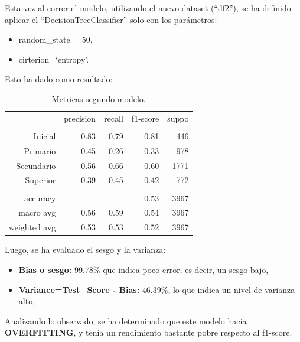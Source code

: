 \documentclass[a4paper]{article}
\begin{document}
            Esta vez al correr el modelo, utilizando el nuevo dataset (``df2''), se ha definido aplicar el ``DecisionTreeClassifier'' solo con los parámetros:
            \begin{itemize}
                \item random\_state = 50,
                \item cirterion=`entropy'.
            \end{itemize}

\vspace{1cm}
            Esto ha dado como resultado:  

            \begin{table}[!ht]
                \centering
                \begin{tabular}{rrrrr}
                    ~ & precision & recall & f1-score & suppo \\
                    & & & & \\
                    Inicial    & 0.83 & 0.79 & 0.81 & 446 \\
                    Primario   & 0.45 & 0.26 & 0.33 & 978 \\
                    Secundario & 0.56 & 0.66 & 0.60 & 1771 \\
                    Superior   & 0.39 & 0.45 & 0.42 & 772 \\
                    & & & & \\
                    accuracy & & & 0.53 & 3967 \\
                    macro avg & 0.56 & 0.59 & 0.54 & 3967 \\
                    weighted avg & 0.53 & 0.53 & 0.52 & 3967 \\
                \end{tabular}
                \caption{Metricas segundo modelo.}
                \label{Second model metrics}
            \end{table}

            Luego, se ha evaluado el sesgo y la varianza:
            \begin{itemize}
                \item \textbf{Bias o sesgo:} 99.78\% que indica poco error, es decir, un sesgo bajo,
                \item \textbf{Variance=Test\_Score - Bias:} 46.39\%, lo que indica un nivel de varianza alto,
            \end{itemize}
            
            Analizando lo observado, se ha determinado que este modelo hacía \textbf{OVERFITTING}, y tenía un rendimiento bastante pobre respecto al f1-score.
\end{document}
